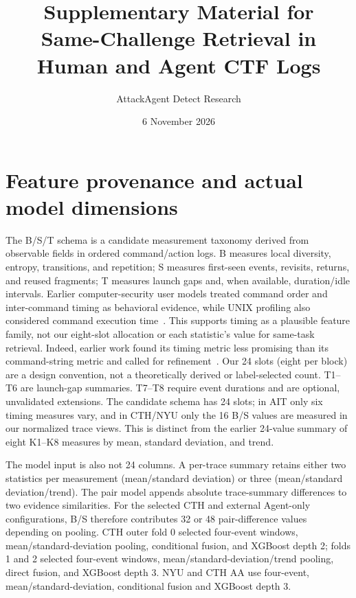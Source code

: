\documentclass[10pt]{article}
\title{Supplementary Material for\\Same-Challenge Retrieval in Human and Agent CTF Logs}
\author{AttackAgent Detect Research}
\date{6 November 2026}
\begin{document}
\maketitle

\section{Feature provenance and actual model dimensions}
The B/S/T schema is a candidate measurement taxonomy derived from observable fields in ordered command/action logs. B measures local diversity, entropy, transitions, and repetition; S measures first-seen events, revisits, returns, and reused fragments; T measures launch gaps and, when available, duration/idle intervals. Earlier computer-security user models treated command order and inter-command timing as behavioral evidence, while UNIX profiling also considered command execution time~\cite{mcmahon,dao}. This supports timing as a plausible feature family, not our eight-slot allocation or each statistic's value for same-task retrieval. Indeed, earlier work found its timing metric less promising than its command-string metric and called for refinement~\cite{mcmahon}. Our 24 slots (eight per block) are a design convention, not a theoretically derived or label-selected count. T1--T6 are launch-gap summaries. T7--T8 require event durations and are optional, unvalidated extensions. The candidate schema has 24 slots; in AIT only six timing measures vary, and in CTH/NYU only the 16 B/S values are measured in our normalized trace views. This is distinct from the earlier 24-value summary of eight K1--K8 measures by mean, standard deviation, and trend.

The model input is also not 24 columns. A per-trace summary retains either two statistics per measurement (mean/standard deviation) or three (mean/standard deviation/trend). The pair model appends absolute trace-summary differences to two evidence similarities. For the selected CTH and external Agent-only configurations, B/S therefore contributes 32 or 48 pair-difference values depending on pooling. CTH outer fold 0 selected four-event windows, mean/standard-deviation pooling, conditional fusion, and XGBoost depth 2; folds 1 and 2 selected four-event windows, mean/standard-deviation/trend pooling, direct fusion, and XGBoost depth 3. NYU and CTH AA use four-event, mean/standard-deviation, conditional fusion and XGBoost depth 3.
\end{document}
